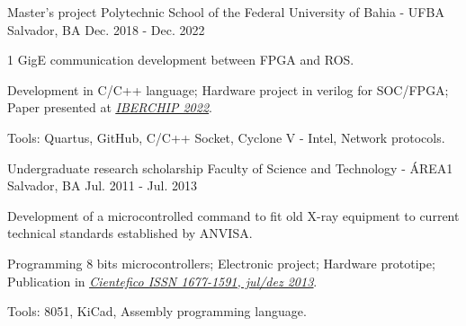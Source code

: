 \begin{cventries}
  \cventry
    {Master's project} %
    {Polytechnic School of the Federal University of Bahia - UFBA} %
    {Salvador, BA} %
    {Dec. 2018 - Dec. 2022} %
    {
      \begin{cvitems} %
        \item {1 GigE communication development between FPGA and ROS.}
        \item {Development in C/C++ language; Hardware project in verilog for SOC/FPGA; Paper presented at \underline{\href{https://ieee-lascas.org/}{\emph{IBERCHIP 2022}}}.}
        \item {Tools: Quartus, GitHub, C/C++ Socket, Cyclone V - Intel, Network protocols.}
      \end{cvitems}
    }

  \cventry
    {Undergraduate research scholarship} %
    {Faculty of Science and Technology - ÁREA1} %
    {Salvador, BA} %
    {Jul. 2011 - Jul. 2013} %
    {
      \begin{cvitems} %
        \item {Development of a microcontrolled command to fit old X-ray equipment to current technical standards established by ANVISA.}
        \item {Programming 8 bits microcontrollers; Electronic project; Hardware prototipe; Publication in \underline{\href{https://cientefico.emnuvens.com.br/cientefico/article/view/58}{\emph{Cientefico ISSN 1677-1591, jul/dez 2013}}}.}
        \item {Tools: 8051, KiCad, Assembly programming language.}
      \end{cvitems}
    }
    

\end{cventries}

